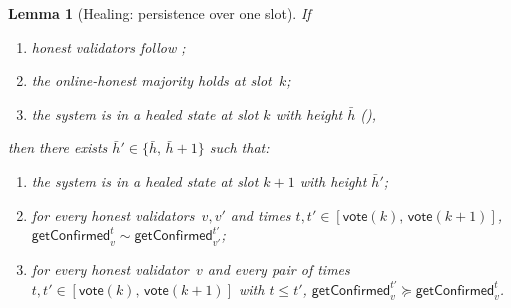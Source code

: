 \documentclass{article}
\newcommand{\vote}{\mathsf{vote}}
\newcommand{\comm}[1]{\bar{#1}}
\newcommand{\getConfirmed}{\textsf{getConfirmed}\xspace}
\theoremstyle{plain}
\newtheorem{lemma}{Lemma}
\theoremstyle{definition}
\theoremstyle{remark}
\newcommand{\OHM}{online-honest majority\xspace}
\begin{document}
\begin{lemma}[Healing: persistence over one slot]\label{rev:lem:healing-persistence}
If
\begin{enumerate}
  \item honest validators follow ;
  \item the \OHM holds at slot~$k$;
  \item the system is in a healed state at slot $k$ with height $\comm{h}$ (),
\end{enumerate}
then there exists $\comm{h}' \in \{\comm{h},\, \comm{h}+1\}$ such that:
\begin{enumerate}
  \item the system is in a healed state at slot $k+1$ with height $\comm{h}'$;
  \item for every honest validators~$v,v'$ and times $t, t' \in [\vote(k),\, \vote(k+1)]$, $\getConfirmed_v^{t} \sim \getConfirmed_{v'}^{t'}$;
  \item for every honest validator~$v$ and every pair of times $t, t' \in [\vote(k),\, \vote(k+1)]$ with $t \leq t'$, $\getConfirmed_v^{t'} \succeq \getConfirmed_v^t$.
\end{enumerate}
\end{lemma}
\end{document}
